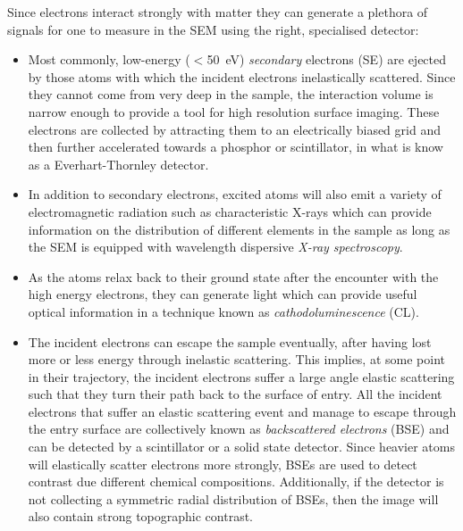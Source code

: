 Since electrons interact strongly with matter they can generate a plethora of signals for one to measure in the SEM using the right, specialised detector:
\begin{itemize}
    \item Most commonly, low-energy ($<$\SI{50}{\electronvolt}) \textit{secondary} electrons (SE) are ejected by those atoms with which the incident electrons inelastically scattered. Since they cannot come from very deep in the sample, the interaction volume is narrow enough to provide a tool for high resolution surface imaging. These electrons are collected by attracting them to an electrically biased grid and then further accelerated towards a phosphor or scintillator, in what is know as a Everhart-Thornley detector\cite{ETdetector}.
    
    
    
    \item In addition to secondary electrons, excited atoms will also emit a variety of electromagnetic radiation such as characteristic X-rays which can provide information on the distribution of different elements in the sample as long as the SEM is equipped with wavelength dispersive \textit{X-ray spectroscopy}. 
    
    \item As the atoms relax back to their ground state after the encounter with the high energy electrons, they can generate light which can provide useful optical information in a technique known as \textit{cathodoluminescence} (CL).
    
    \item The incident electrons can escape the sample eventually, after having lost more or less energy through inelastic scattering. This implies, at some point in their trajectory, the incident electrons suffer a large angle elastic scattering such that they turn their path back to the surface of entry. All the incident electrons that suffer an elastic scattering event and manage to escape through the entry surface are collectively known as \textit{backscattered electrons} (BSE) and can be detected by a scintillator or a solid state detector. Since heavier atoms will elastically scatter electrons more strongly, BSEs are used to detect contrast due different chemical compositions. Additionally, if the detector is not collecting a symmetric radial distribution of BSEs, then the image will also contain strong topographic contrast. 
    

\end{itemize}

